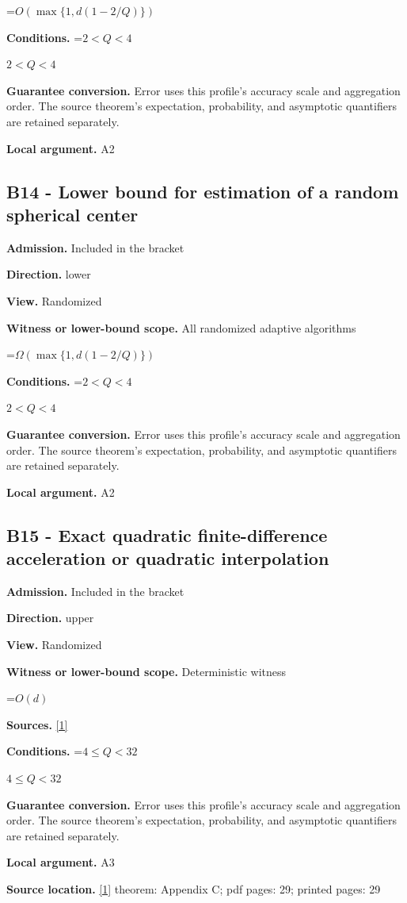 \documentclass[10pt,a4paper]{article}
\newcommand{\AtlasMath}[1]{\par\begingroup\centering\setbox0=\hbox{$\displaystyle #1$}\ifdim\wd0>1.4\linewidth\typeout{ATLAS WIDE FORMULA: \the\wd0}\fi\ifdim\wd0>\linewidth\resizebox{\linewidth}{!}{\box0}\else\box0\fi\par\endgroup}
\newcommand{\AtlasInlineMath}[1]{\begingroup\setbox0=\hbox{$#1$}\ifdim\wd0>.4\linewidth\endgroup\AtlasMath{#1}\else\endgroup$#1$\fi}
\begin{document}
\AtlasMath{O(\max\{1,d(1-2/Q)\})}
\textbf{Conditions.} \AtlasInlineMath{2<Q<4}

\textbf{Guarantee conversion.} Error uses this profile's accuracy scale and aggregation order. The source theorem's expectation, probability, and asymptotic quantifiers are retained separately.

\textbf{Local argument.} A2

\subsection{B14 - Lower bound for estimation of a random spherical center}
\textbf{Admission.} Included in the bracket

\textbf{Direction.} lower

\textbf{View.} Randomized

\textbf{Witness or lower-bound scope.} All randomized adaptive algorithms

\AtlasMath{\Omega(\max\{1,d(1-2/Q)\})}
\textbf{Conditions.} \AtlasInlineMath{2<Q<4}

\textbf{Guarantee conversion.} Error uses this profile's accuracy scale and aggregation order. The source theorem's expectation, probability, and asymptotic quantifiers are retained separately.

\textbf{Local argument.} A2

\subsection{B15 - Exact quadratic finite-difference acceleration or quadratic interpolation}
\textbf{Admission.} Included in the bracket

\textbf{Direction.} upper

\textbf{View.} Randomized

\textbf{Witness or lower-bound scope.} Deterministic witness

\AtlasMath{O(d)}
\textbf{Sources.} \href{https://arxiv.org/html/2610.00345v1}{[1]}

\textbf{Conditions.} \AtlasInlineMath{4\le Q<32}

\textbf{Guarantee conversion.} Error uses this profile's accuracy scale and aggregation order. The source theorem's expectation, probability, and asymptotic quantifiers are retained separately.

\textbf{Local argument.} A3

\textbf{Source location.} \href{https://arxiv.org/html/2610.00345v1}{[1]} theorem: Appendix C; pdf pages: 29; printed pages: 29
\end{document}
